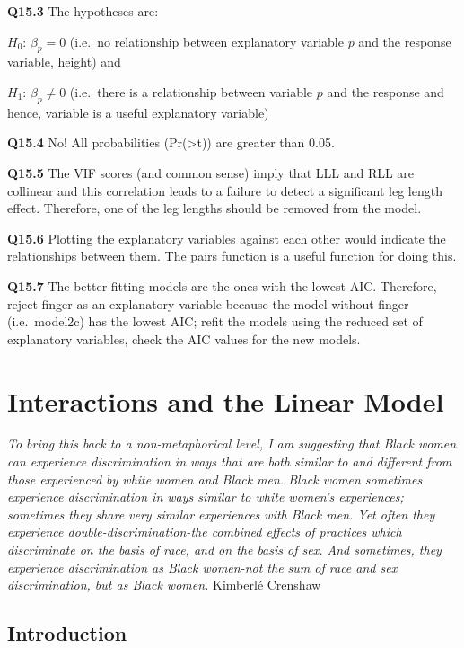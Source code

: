 \documentclass[
  oneside]{krantz}
\begin{document}
\textbf{Q15.3} The hypotheses are:
\raggedright
\(H_{0}\): \({\beta{}}_p=0\) (i.e.~no relationship between explanatory variable \(p\) and the response variable, height) and

\raggedright

\(H_{1}\): \({\beta{}}_p\not=0\) (i.e.~there is a relationship between variable \(p\) and the response and hence, variable is a useful explanatory variable)

\textbf{Q15.4} No! All probabilities (Pr(\textgreater\textbar t\textbar)) are greater than 0.05.

\textbf{Q15.5} The VIF scores (and common sense) imply that LLL and RLL are collinear and this correlation leads to a failure to detect a significant leg length effect. Therefore, one of the leg lengths should be removed from the model.

\textbf{Q15.6} Plotting the explanatory variables against each other would indicate the relationships between them. The pairs function is a useful function for doing this.

\textbf{Q15.7} The better fitting models are the ones with the lowest AIC. Therefore, reject finger as an explanatory variable because the model without finger (i.e.~model2c) has the lowest AIC; refit the models using the reduced set of explanatory variables, check the AIC values for the new models.

\hypertarget{interac}{%
\chapter{Interactions and the Linear Model}\label{interac}}

\emph{To bring this back to a non-metaphorical level, I am suggesting that Black women can experience discrimination in ways that are both similar to and different from those experienced by
white women and Black men. Black women sometimes experience discrimination in ways similar to white women's experiences; sometimes they share very similar experiences with Black men. Yet
often they experience double-discrimination-the combined effects of practices which discriminate on the basis of race, and on the basis of sex. And sometimes, they experience discrimination as
Black women-not the sum of race and sex discrimination, but as Black women.}
Kimberlé Crenshaw \citeyearpar{Crenshaw1989}

\hypertarget{INTinterac}{%
\section{Introduction}\label{INTinterac}}
\end{document}

